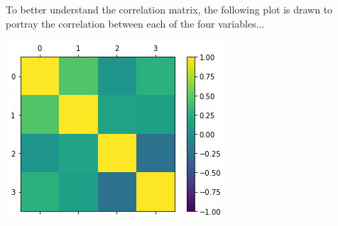 \documentclass[a4paper,11pt]{article}
\begin{document}
{To better understand the correlation matrix, the following plot is drawn to portray the correlation between each of the four variables...

\includegraphics{plot}

}
\end{document}

